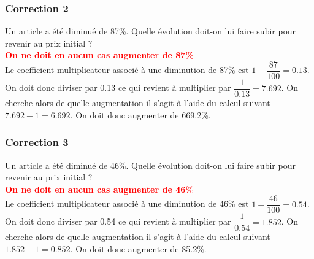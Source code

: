 \documentclass[15pt, mathserif]{beamer}
\begin{document}
\begin{frame}
\vspace{-10mm}
	\frametitle{Correction 2}
\vspace*{1cm} Un article a été diminué de 87\%. Quelle évolution doit-on lui faire subir pour revenir au prix initial ? \\ \bcattention \textcolor{red}{\textbf{On ne doit en aucun cas augmenter de 87\%}} \\ Le coefficient multiplicateur associé à une diminution de 87\% est $1-\dfrac{87}{100}=0.13$. On doit donc diviser par 0.13 ce qui revient à multiplier par $\dfrac{1}{0.13}=7.692$. On cherche alors de quelle augmentation il s'agit à l'aide du calcul suivant $7.692-1=6.692$. On doit donc augmenter de 669.2\%. \\ \begin{center}  
  \end{center}\end{frame}


\begin{frame}
\vspace{-10mm}
	\frametitle{Correction 3}
\vspace*{1cm} Un article a été diminué de 46\%. Quelle évolution doit-on lui faire subir pour revenir au prix initial ? \\ \bcattention \textcolor{red}{\textbf{On ne doit en aucun cas augmenter de 46\%}} \\ Le coefficient multiplicateur associé à une diminution de 46\% est $1-\dfrac{46}{100}=0.54$. On doit donc diviser par 0.54 ce qui revient à multiplier par $\dfrac{1}{0.54}=1.852$. On cherche alors de quelle augmentation il s'agit à l'aide du calcul suivant $1.852-1=0.852$. On doit donc augmenter de 85.2\%. \\ \begin{center}  
  \end{center}\end{frame}
\end{document}
